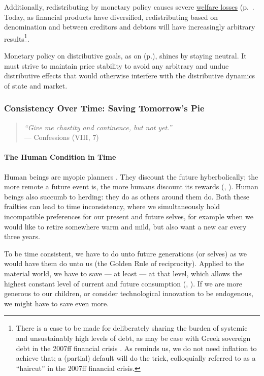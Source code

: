 Additionally, redistributing by monetary policy causes severe \hyperref[sec:price-stability]{welfare losses} (p.~\pageref{sec:price-stability}. Today, as financial products have diversified, redistributing based on denomination and between creditors and debtors will have increasingly arbitrary results\footnote{
	There is a case to be made for deliberately sharing the burden of systemic and unsustainably high levels of debt, as may be case with Greek sovereign debt in the 2007ff financial crisis \citep{Coggan2011}. As \citeauthor{Coggan2011} reminds us, we do not need inflation to achieve that; a (partial) default will do the trick, colloquially referred to as a ``haircut'' in the 2007ff financial crisis.}.

Monetary policy on distributive goals, as on  (p.\pageref{sec:production}), shines by staying neutral. It must strive to maintain price stability to avoid any arbitrary and undue distributive effects that would otherwise interfere with the distributive dynamics of state and market.

\subsubsection[Consistency Over Time]{Consistency Over Time: Saving Tomorrow's Pie}\label{sec:time} 

\begin{quote}
\emph{``Give me chastity and continence, but not yet.''\\}
--- \citeauthor{St.AugusteofHippo397} Confessions (VIII, 7)
\end{quote}

\paragraph{The Human Condition in Time}
Human beings are myopic planners \citep{Kahneman47}. They discount the future hyberbolically; the more remote a future event is, the more humans discount its rewards (\citealt{Ainslie1975}, \citealt{Thaler1981}). Human beings also succumb to herding: they do as others around them do. %
Both these frailties can lead to time inconsistency, where we simultaneously hold incompatible preferences for our present and future selves, for example when we would like to retire somewhere warm and mild, but also want a new car every three years.

To be time consistent, we have to do unto future generations (or selves) as we would have them do unto us (the Golden Rule of reciprocity). Applied to the material world, we have to save --- at least --- at that level, which allows the highest constant level of current and future consumption (\citealt{Phelps1966a}, \citealt{Solow1956}). If we are more generous to our children, or consider technological innovation to be endogenous, we might have to save even more.

